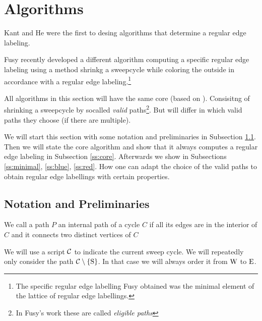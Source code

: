 \newenvironment{invariants}{%
  \refstepcounter{thrm}%
  \paragraph{Invariants~\theprop}%
  \renewcommand*{\theenumi}{\theprop\,(I\arabic{enumi})}%
  \renewcommand*{\labelenumi}{(I\arabic{enumi})}%
  \enumerate
}{%
  \endenumerate
}

\section{Algorithms}
Kant and He \cite{KH} were the first to desing algorithms that determine a regular edge labeling. 

Fusy \cite{Fusy2006, Fusy2009} recently developed a different algorithm computing a specific regular edge labeling using a method shrinkg a sweepcycle while coloring the outside in accordance with a regular edge labeling.\footnote{The specific regular edge labelling Fusy obtained was the minimal element of the lattice of regular edge labellings.}

All algorithms in this section will have the same core (based on \cite{Fusy2006}). Consisitng of shrinking a sweepcycle by socalled \emph{valid} paths\footnote{In Fusy's work these are called \emph{eligible paths}}. But will differ in which valid paths they choose (if there are multiple).


We will start this section with some notation and preliminaries in Subsection \ref{ss:not}. Then we will state the core algorithm and show that it always computes a regular edge labeling in Subsection \ref{ss:core}. Afterwards we show in Subsections \ref{ss:minimal}, \ref{ss:blue}, \ref{ss:red}. How one can adapt the choice of the valid paths to obtain regular edge labellings with certain properties. 


\subsection{Notation and Preliminaries}
\label{ss:not}
\begin{defi}
We call a path $P$ an internal path of a cycle $C$ if all its edges are in the interior of $C$ and it connects two distinct vertices of $C$ 
\end{defi}

We will use a script $\mathcal{C}$ to indicate the current sweep cycle. 
We will repeatedly only consider the path $\mathcal{C} \setminus \left\lbrace {\mathrm{S}} \right\rbrace$. In that case we will always order it from $\mathrm{W}$ to $\mathrm{E}$. 

